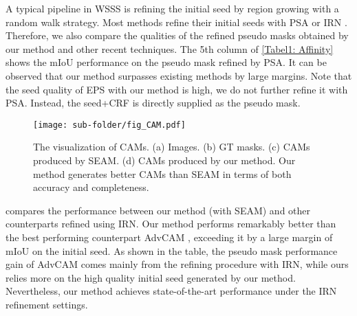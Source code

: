 \documentclass[10pt,twocolumn,letterpaper]{article}
\begin{document}
A typical pipeline in WSSS is refining the initial seed by region growing with a random walk strategy.
Most methods refine their initial seeds with PSA \cite{ahn2018learningAffinityNet} or IRN \cite{ahn2019weaklyIRNet}.
Therefore, we also compare the qualities of the refined pseudo masks obtained by our method and other recent techniques. 
The 5th column of \cref{Tabel1: Affinity} shows the mIoU performance on the pseudo mask refined by PSA.
It can be observed that our method surpasses existing methods by large margins. Note that the seed quality of EPS with our method is high, we do not further refine it with PSA. Instead, the seed+CRF is directly supplied as the pseudo mask.

\begin{figure}[t]
\centering
\begin{center}
\texttt{[image: sub-folder/fig\_CAM.pdf]}
\end{center}
\caption{The visualization of CAMs. (a) Images. (b) GT masks. (c) CAMs produced by SEAM. (d) CAMs produced by our method. Our method generates better CAMs than SEAM in terms of both accuracy and completeness.}
\label{fig:CAM}
\end{figure}

 compares the performance between our method (with SEAM) and other counterparts refined using IRN.
Our method performs remarkably better than the best performing counterpart AdvCAM \cite{lee2021antiADVCAM}, exceeding it by a large margin of  mIoU on the initial seed. As shown in the table, the pseudo mask performance gain of AdvCAM comes mainly from the refining procedure with IRN, while ours relies more on the high quality initial seed generated by our method.
Nevertheless, our method achieves state-of-the-art performance under the IRN refinement settings.
\end{document}
